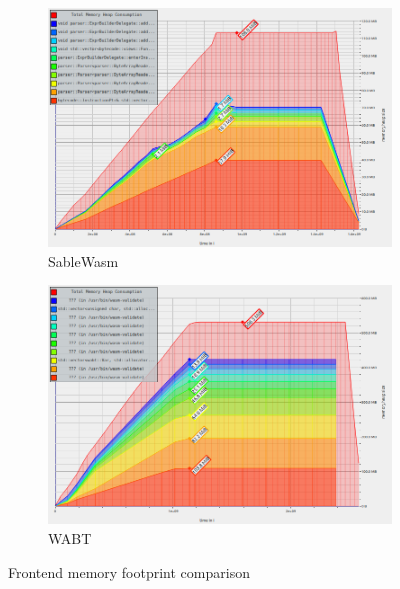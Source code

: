\begin{figure}
  \centering
  \begin{subfigure}[t]{0.87\textwidth}
    \includegraphics[width=\textwidth]{Images/sablewasm-validate-memory.png}
	\caption{SableWasm}\label{fig:sablewasm-eval-memory-sablewasm}		
  \end{subfigure}
  \begin{subfigure}[t]{0.87\textwidth}
    \includegraphics[width=\textwidth]{Images/wabt-validate-memory.png}
	\caption{WABT}\label{fig:sablewasm-eval-memory-wabt}		
  \end{subfigure}
  \caption{Frontend memory footprint comparison}
  \label{fig:sablewasm-eval-memory}
\end{figure}

